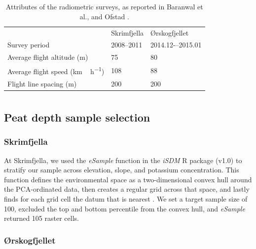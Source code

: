 \documentclass[soil, manuscript]{copernicus}
\begin{document}
\newpage
\appendix
\section{}

\appendixtables
\begin{table}[ht]
\caption{Attributes of the radiometric surveys, as reported in Baranwal et al., \citeyearpar{baranwalHelicopterborneMagneticElectromagnetic2013} and Ofstad \citeyearpar{ofstadHelicopterborneMagneticRadiometric2015}.}
\begin{tabular}{lll}
\hline
& Skrimfjella & Ørskogfjellet              \\ \cline{2-3} 
Survey period                            & 2008--2011   & 2014.12-–2015.01 \\
Average flight altitude (m)              & 75           & 80               \\
Average flight speed (\unit{km\,h^{-1}}) & 108          & 88               \\
Flight line spacing (m)                  & 200          & 200              \\ \hline
\end{tabular}
\label{tab:radSurveys}
\end{table}
\clearpage

\section{}
\subsection{Peat depth sample selection} \label{sec:sample-selection}
\subsubsection{Skrimfjella}

At Skrimfjella, we used the \emph{eSample} function in the \emph{iSDM} R package (v1.0) to stratify our sample across elevation, slope, and potassium concentration.
This function defines the environmental space as a two-dimensional convex hull around the PCA-ordinated data, then creates a regular grid across that space, and lastly finds for each grid cell the datum that is nearest \citep{hattabUnifiedFrameworkModel2017}.
We set a target sample size of 100, excluded the top and bottom percentile from the convex hull, and \emph{eSample} returned 105 raster cells.

\subsubsection{Ørskogfjellet}
\end{document}
